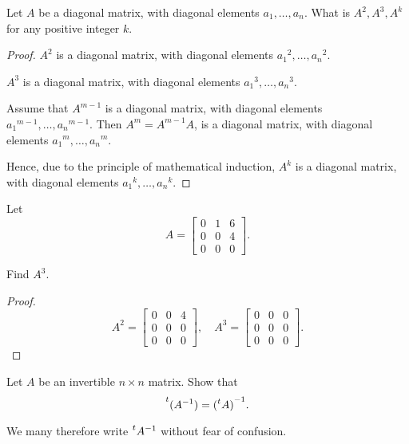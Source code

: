 \begin{exercise}
    Let $A$ be a diagonal matrix, with diagonal elements $a_{1}, \ldots, a_{n}$. What is $A^{2}, A^{3}, A^{k}$ for any positive integer $k$.
\end{exercise}

\begin{proof}
    $A^{2}$ is a diagonal matrix, with diagonal elements ${a_{1}}^{2}, \ldots, {a_{n}}^{2}$.

    $A^{3}$ is a diagonal matrix, with diagonal elements ${a_{1}}^{3}, \ldots, {a_{n}}^{3}$.

    Assume that $A^{m-1}$ is a diagonal matrix, with diagonal elements ${a_{1}}^{m-1}, \ldots, {a_{n}}^{m-1}$. Then $A^{m} = A^{m-1}A$, is a diagonal matrix, with diagonal elements ${a_{1}}^{m}, \ldots, {a_{n}}^{m}$.

    Hence, due to the principle of mathematical induction, $A^{k}$ is a diagonal matrix, with diagonal elements ${a_{1}}^{k}, \ldots, {a_{n}}^{k}$.
\end{proof}

\begin{exercise}
    Let
    \[
        A = \begin{bmatrix}
            0 & 1 & 6 \\
            0 & 0 & 4 \\
            0 & 0 & 0
        \end{bmatrix}.
    \]

    Find $A^{3}$.
\end{exercise}

\begin{proof}
    \[
        A^{2} = \begin{bmatrix}
            0 & 0 & 4 \\
            0 & 0 & 0 \\
            0 & 0 & 0
        \end{bmatrix},\quad
        A^{3} = \begin{bmatrix}
            0 & 0 & 0 \\
            0 & 0 & 0 \\
            0 & 0 & 0
        \end{bmatrix}.
    \]
\end{proof}

\begin{exercise}
    Let $A$ be an invertible $n\times n$ matrix. Show that
    \[
        \prescript{t}{}{{(A^{-1})}} = {(\prescript{t}{}{A})}^{-1}.
    \]

    We many therefore write $\prescript{t}{}{A}^{-1}$ without fear of confusion.
\end{exercise}

